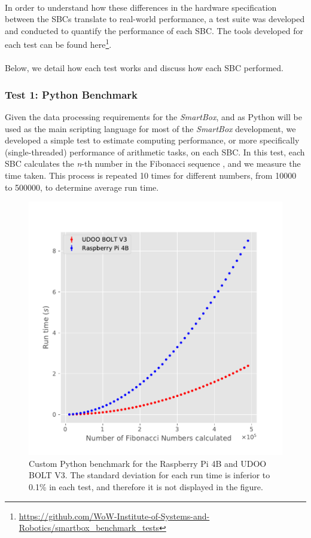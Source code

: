 \paragraph{} In order to understand how these differences in the hardware specification between the \acs{SBC}s translate to real-world performance, a test suite was developed and conducted to quantify the performance of each \acs{SBC}. The tools developed for each test can be found here\footnote{\url{https://github.com/WoW-Institute-of-Systems-and-Robotics/smartbox\_benchmark\_tests}}. 

\paragraph{}Below, we detail how each test works and discuss how each \acs{SBC} performed. 

\subsubsection{Test 1: Python Benchmark}

Given the data processing requirements for the \textit{SmartBox}, and as Python will be used as the main scripting language for most of the \textit{SmartBox} development, we developed a simple test to estimate computing performance, or more specifically (single-threaded) performance of arithmetic tasks, on each \acs{SBC}. In this test, each \acs{SBC} calculates the \textit{n}-th number in the Fibonacci sequence \cite{pierce1951fibonacci}, and we measure the time taken. This process is repeated 10 times for different numbers, from 10000 to 500000, to determine average run time.

\begin{figure}[H]
    \centering
    \includegraphics[width=0.70 \linewidth]{images/fibonacci-test.pdf}
    \caption [Custom Python benchmark for the Raspberry Pi 4B and UDOO BOLT V3.]{ Custom Python benchmark for the Raspberry Pi 4B and UDOO BOLT V3. The standard deviation for each run time is inferior to 0.1\% in each test, and therefore it is not displayed in the figure.}
    \label{fig:fibonacci-tests}
\end{figure}


